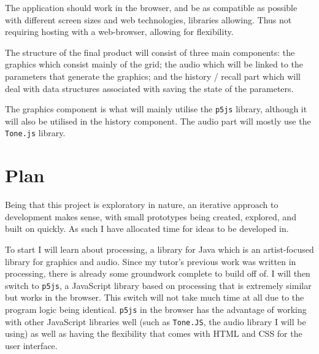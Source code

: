 The application should work in the browser, and be as compatible as possible
with different screen sizes and web technologies, libraries allowing. Thus not
requiring hosting with a web-browser, allowing for flexibility.

The structure of the final product will consist of three main components: the
graphics which consist mainly of the grid; the audio which will be linked to the
parameters that generate the graphics; and the history / recall part which will
deal with data structures associated with saving the state of the parameters.

The graphics component is what will mainly utilise the \verb|p5js| library,
although it will also be utilised in the history component. The audio part will
mostly use the \verb|Tone.js| library.

\section{Plan}
Being that this project is exploratory in nature, an iterative approach to
development makes sense, with small prototypes being created, explored, and
built on quickly. As such I have allocated time for ideas to be developed in.

To start I will learn about processing, a library for Java which is an
artist-focused library for graphics and audio. Since my tutor's previous work
was written in processing, there is already some groundwork complete to build
off of. I will then switch to \verb|p5js|, a JavaScript library based on
processing that is extremely similar but works in the browser. This switch will
not take much time at all due to the program logic being identical. \verb|p5js|
in the browser has the advantage of working with other JavaScript libraries well
(such as \verb|Tone.JS|, the audio library I will be using) as well as having
the flexibility that comes with HTML and CSS for the user interface.

